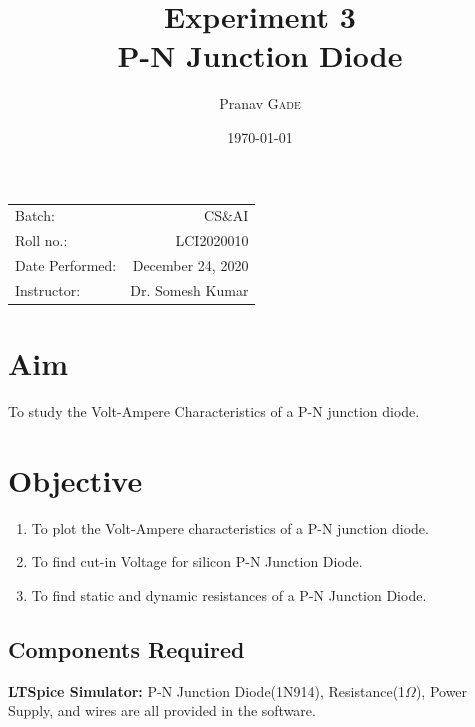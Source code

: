\documentclass{article}
\title{Experiment 3\\P-N Junction Diode} %
\author{Pranav \textsc{Gade}} %
\date{\today} %
\begin{document}
	
	\maketitle %
	
	\begin{center}
		\begin{tabular}{l r}
			Batch: & CS\&AI \\
			Roll no.: & LCI2020010 \\
			Date Performed: & December 24, 2020 \\ %
			Instructor: & Dr. Somesh Kumar %
		\end{tabular}
	\end{center}
	
	
	
	\section{Aim}
	
	To study the Volt-Ampere Characteristics of a P-N junction diode.
	
	\section{Objective}
	\begin{enumerate}
		\item To plot the Volt-Ampere characteristics of a P-N junction diode.
		\item To find cut-in Voltage for silicon P-N Junction Diode.
		\item To find static and dynamic resistances of a P-N Junction Diode.
	\end{enumerate}
	
	\subsection{Components Required}
	\textbf{LTSpice Simulator:} P-N Junction Diode(1N914), Resistance(1$\Omega$), Power Supply, and wires are all provided in the software.
	
\end{document}
